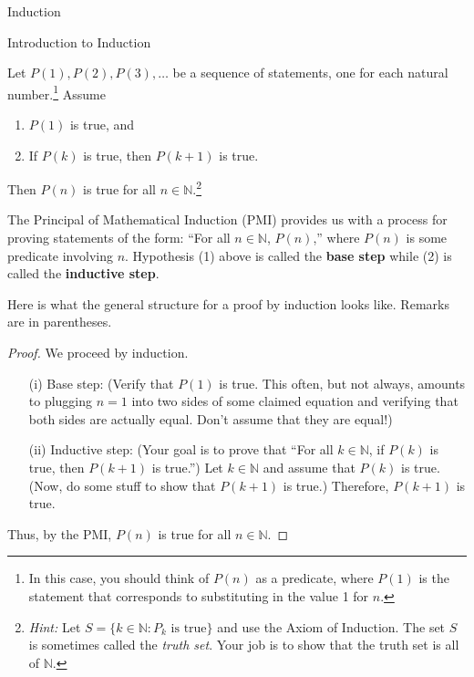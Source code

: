 \begin{chapter}{Induction}
\begin{section}{Introduction to Induction}
\begin{theorem}
Let $P(1), P(2), P(3), \ldots$ be a sequence of statements, one for each natural number.\footnote{In this case, you should think of $P(n)$ as a predicate, where $P(1)$ is the statement that corresponds to substituting in the value 1 for $n$.} Assume
\begin{enumerate}
\item $P(1)$ is true, and
\item If $P(k)$ is true, then $P(k+1)$ is true.
\end{enumerate}
Then $P(n)$ is true for all $n\in\mathbb{N}$.\footnote{\emph{Hint:} Let $S=\{k\in \mathbb{N}: P_k \text{ is true}\}$ and use the Axiom of Induction.  The set $S$ is sometimes called the \emph{truth set}.  Your job is to show that the truth set is all of $\mathbb{N}$.}
\end{theorem}

\begin{remark}
The Principal of Mathematical Induction (PMI) provides us with a process for proving statements of the form: ``For all $n\in\mathbb{N}$, $P(n)$,'' where $P(n)$ is some predicate involving $n$.  Hypothesis (1) above is called the \textbf{base step} while (2) is called the \textbf{inductive step}.
\end{remark} 

\begin{skeleton}
Here is what the general structure for a proof by induction looks like.  Remarks are in parentheses.

\bigskip

\begin{textbox}
\begin{proof}
We proceed by induction.
\begin{enumerate}
\item[(i)] Base step: (Verify that $P(1)$ is true.  This often, but not always, amounts to plugging $n=1$ into two sides of some claimed equation and verifying that both sides are actually equal.  Don't assume that they are equal!)

\item[(ii)] Inductive step:  (Your goal is to prove that ``For all $k\in\mathbb{N}$, if $P(k)$ is true, then $P(k+1)$ is true.'')  Let $k\in\mathbb{N}$ and assume that $P(k)$ is true.  (Now, do some stuff to show that $P(k+1)$ is true.)  Therefore, $P(k+1)$ is true.
\end{enumerate}
Thus, by the PMI, $P(n)$ is true for all $n\in\mathbb{N}$.
\end{proof}
\end{textbox}


\end{skeleton}
\end{section}
\end{chapter}
